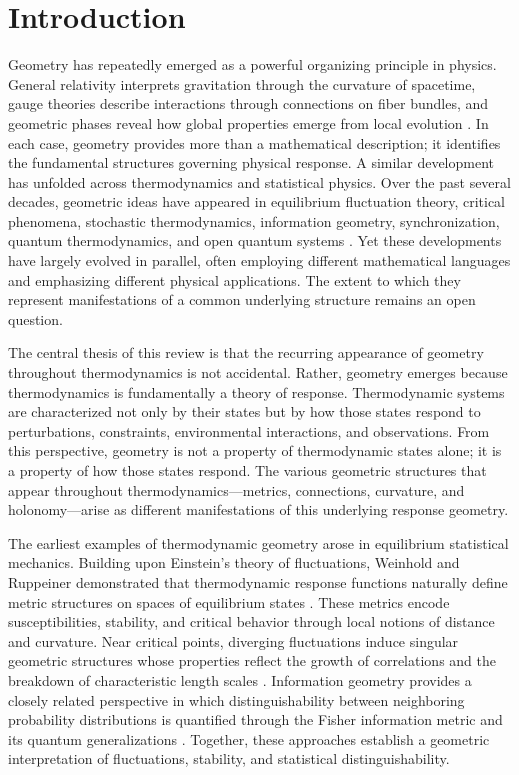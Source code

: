 \section{Introduction}

Geometry has repeatedly emerged as a powerful organizing principle in physics. General relativity interprets gravitation through the curvature of spacetime, gauge theories describe interactions through connections on fiber bundles, and geometric phases reveal how global properties emerge from local evolution \cite{Einstein1915,Berry1984}. In each case, geometry provides more than a mathematical description; it identifies the fundamental structures governing physical response. A similar development has unfolded across thermodynamics and statistical physics. Over the past several decades, geometric ideas have appeared in equilibrium fluctuation theory, critical phenomena, stochastic thermodynamics, information geometry, synchronization, quantum thermodynamics, and open quantum systems \cite{Weinhold1975,Ruppeiner1979,Ruppeiner1995,Amari2000,Seifert2012}. Yet these developments have largely evolved in parallel, often employing different mathematical languages and emphasizing different physical applications. The extent to which they represent manifestations of a common underlying structure remains an open question.

The central thesis of this review is that the recurring appearance of geometry throughout thermodynamics is not accidental. Rather, geometry emerges because thermodynamics is fundamentally a theory of response. Thermodynamic systems are characterized not only by their states but by how those states respond to perturbations, constraints, environmental interactions, and observations. From this perspective, geometry is not a property of thermodynamic states alone; it is a property of how those states respond. The various geometric structures that appear throughout thermodynamics—metrics, connections, curvature, and holonomy—arise as different manifestations of this underlying response geometry.

The earliest examples of thermodynamic geometry arose in equilibrium statistical mechanics. Building upon Einstein’s theory of fluctuations, Weinhold and Ruppeiner demonstrated that thermodynamic response functions naturally define metric structures on spaces of equilibrium states \cite{Einstein1910,Weinhold1975,Ruppeiner1979,Ruppeiner1995}. These metrics encode susceptibilities, stability, and critical behavior through local notions of distance and curvature. Near critical points, diverging fluctuations induce singular geometric structures whose properties reflect the growth of correlations and the breakdown of characteristic length scales \cite{Ruppeiner1995,Gu2010}. Information geometry provides a closely related perspective in which distinguishability between neighboring probability distributions is quantified through the Fisher information metric and its quantum generalizations \cite{Fisher1925,Amari2000,BraunsteinCaves1994,Paris2009}. Together, these approaches establish a geometric interpretation of fluctuations, stability, and statistical distinguishability.

